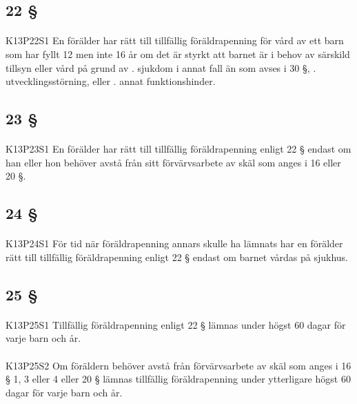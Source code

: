 \documentclass[a4paper,notitlepage,openany,10pt]{book}
\begin{document}
\subsection*{22 §}
\paragraph*{}
{\tiny K13P22S1}
En förälder har rätt till tillfällig föräldrapenning för vård av ett barn som har fyllt 12 men inte 16 år om det är styrkt att barnet är i behov av särskild tillsyn eller vård på grund av
. sjukdom i annat fall än som avses i 30 §,
. utvecklingsstörning, eller
. annat funktionshinder.
\subsection*{23 §}
\paragraph*{}
{\tiny K13P23S1}
En förälder har rätt till tillfällig föräldrapenning enligt 22 § endast om han eller hon behöver avstå från sitt förvärvsarbete av skäl som anges i 16 eller 20 §.
\subsection*{24 §}
\paragraph*{}
{\tiny K13P24S1}
För tid när föräldrapenning annars skulle ha lämnats har en förälder rätt till tillfällig föräldrapenning enligt 22 § endast om barnet vårdas på sjukhus.
\subsection*{25 §}
\paragraph*{}
{\tiny K13P25S1}
Tillfällig föräldrapenning enligt 22 § lämnas under högst 60 dagar för varje barn och år.
\paragraph*{}
{\tiny K13P25S2}
Om föräldern behöver avstå från förvärvsarbete av skäl som anges i 16 § 1, 3 eller 4 eller 20 § lämnas tillfällig föräldrapenning under ytterligare högst 60 dagar för varje barn och år.
\end{document}
